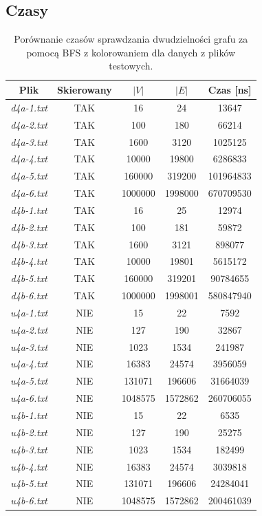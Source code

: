 \documentclass{article}
\begin{document}
\subsection{Czasy}
\begin{table}[H]
\begin{adjustbox}{center}
\begin{tabular}{|c|c|c|c|c|}
    \hline
    Plik & Skierowany & $|V|$ & $|E|$ & Czas [ns]\\
    \hline
    \textit{d4a-1.txt} & TAK & 16 & 24 & 13647\\
    \hline
    \textit{d4a-2.txt} & TAK & 100 & 180 & 66214\\
    \hline
    \textit{d4a-3.txt} & TAK & 1600 & 3120 & 1025125\\
    \hline
    \textit{d4a-4.txt} & TAK & 10000 & 19800 & 6286833\\
    \hline
    \textit{d4a-5.txt} & TAK & 160000 & 319200 & 101964833\\
    \hline
    \textit{d4a-6.txt} & TAK & 1000000 & 1998000 & 670709530\\
    \hline
    \textit{d4b-1.txt} & TAK & 16 & 25 & 12974\\
    \hline
    \textit{d4b-2.txt} & TAK & 100 & 181 & 59872\\
    \hline
    \textit{d4b-3.txt} & TAK & 1600 & 3121 & 898077\\
    \hline
    \textit{d4b-4.txt} & TAK & 10000 & 19801 & 5615172\\
    \hline
    \textit{d4b-5.txt} & TAK & 160000 & 319201 & 90784655\\
    \hline
    \textit{d4b-6.txt} & TAK & 1000000 & 1998001 & 580847940\\
    \hline
    \textit{u4a-1.txt} & NIE & 15 & 22 & 7592\\
    \hline
    \textit{u4a-2.txt} & NIE & 127 & 190 & 32867\\
    \hline
    \textit{u4a-3.txt} & NIE & 1023 & 1534 & 241987\\
    \hline
    \textit{u4a-4.txt} & NIE & 16383 & 24574 & 3956059\\
    \hline
    \textit{u4a-5.txt} & NIE & 131071 & 196606 & 31664039\\
    \hline
    \textit{u4a-6.txt} & NIE & 1048575 & 1572862 & 260706055\\
    \hline
    \textit{u4b-1.txt} & NIE & 15 & 22 & 6535\\
    \hline
    \textit{u4b-2.txt} & NIE & 127 & 190 & 25275\\
    \hline
    \textit{u4b-3.txt} & NIE & 1023 & 1534 & 182499\\
    \hline
    \textit{u4b-4.txt} & NIE & 16383 & 24574 & 3039818\\
    \hline
    \textit{u4b-5.txt} & NIE & 131071 & 196606 & 24284041\\
    \hline
    \textit{u4b-6.txt} & NIE & 1048575 & 1572862 & 200461039\\
    \hline
\end{tabular}
\end{adjustbox}
\caption{Porównanie czasów sprawdzania dwudzielności grafu za pomocą BFS z kolorowaniem dla danych z plików testowych.}
\end{table}
\end{document}
